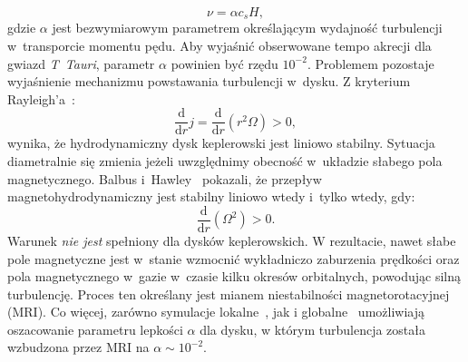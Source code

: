 \begin{equation}\label{eq:alpha}
\nu = \alpha c_s H,
\end{equation}
%
gdzie $\alpha$ jest bezwymiarowym parametrem określającym wydajność
turbulencji w~transporcie momentu pędu. Aby wyjaśnić obserwowane tempo akrecji
dla gwiazd \emph{T~Tauri}, parametr $\alpha$ powinien być rzędu $10^{-2}$.
Problemem pozostaje wyjaśnienie mechanizmu powstawania turbulencji w~dysku. Z
kryterium Rayleigh'a~\cite{C61}:
%
\begin{equation}
   \frac{\mathrm{d}}{\mathrm{d}r} j =
   \frac{\mathrm{d}}{\mathrm{d}r}\left(r^2\Omega\right) > 0,
\end{equation}
%
wynika, że hydrodynamiczny dysk keplerowski jest liniowo stabilny. Sytuacja
diametralnie się zmienia jeżeli uwzględnimy obecność w~układzie 
słabego pola magnetycznego. Balbus i~Hawley~\citep{BH91} pokazali, że przepływ
magnetohydrodynamiczny jest stabilny liniowo wtedy i~tylko wte\-dy, gdy:
%
\begin{equation}\label{eq:mri}
   \frac{\mathrm{d}}{\mathrm{d}r}\left(\Omega^2\right) > 0.
\end{equation}
%
Warunek  \emph{nie jest} spełniony dla dysków keplerowskich. W
rezultacie, nawet słabe pole magnetyczne jest w~stanie wzmocnić wykładniczo
zaburzenia prędkości oraz pola magnetycznego w~gazie w~czasie kilku okresów
orbitalnych, powodując silną turbulencję. Proces ten określany jest mianem
niestabilności magnetorotacyjnej (MRI). Co więcej, zarówno symulacje
lokalne~\cite{DSP10}, jak i globalne~\cite{FD11} umożliwiają oszacowanie
parametru lepkości $\alpha$ dla dysku, w którym turbulencja została wzbudzona
przez MRI na $\alpha\sim 10^{-2}$.

